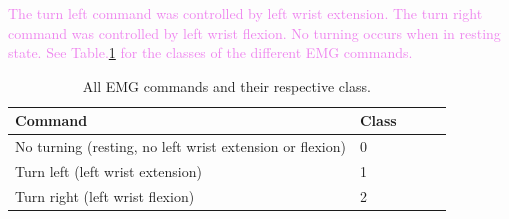\textcolor{violet}{The turn left command was controlled by left wrist extension. The turn right command was controlled by left wrist flexion. No turning occurs when in resting state. See Table.\:\ref{tab:emg_commands} for the classes of the different EMG commands.}
\begin{table}
	\centering
	\begin{tabular}{|l|l|l|l|l|}
		\hline
		Command                                                  & Class \\
		\hline
		No turning (resting, no left wrist extension or flexion) & 0     \\
		Turn left (left wrist extension)                         & 1     \\
		Turn right (left wrist flexion)                          & 2     \\
		\hline
	\end{tabular}
	\caption{All EMG commands and their respective class.}
	\label{tab:emg_commands}
\end{table}

